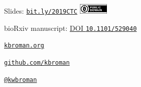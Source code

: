 \documentclass[aspectratio=169,12pt,t]{beamer}
\begin{document}
\begin{frame}[c]{}

\large

Slides: \href{https://bit.ly/2019CTC}{\tt bit.ly/2019CTC} \quad
\includegraphics[height=5mm]{Figs/cc-zero.png}

\vspace{8mm}

bioRxiv manuscript: \href{https://doi.org/10.1101/529040}{DOI {\tt 10.1101/529040}}

\vspace{8mm}

\href{https://kbroman.org}{\tt kbroman.org}

\vspace{8mm}

\href{https://github.com/kbroman}{\tt github.com/kbroman}

\vspace{8mm}

\href{https://twitter.com/kwbroman}{\tt @kwbroman}


\end{frame}
\end{document}
